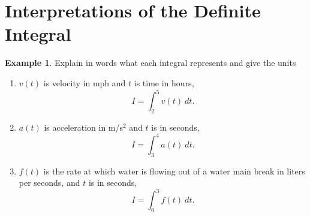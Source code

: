 \documentclass[oneside]{book}
\theoremstyle{definition}
\newtheorem{example}{Example}
\newcommand{\handoutpagebreak}{}
\theoremstyle{solution}
\newtheorem*{solution}{Solution}
\newcommand{\handoutpagebreak}{\newpage}
\newenvironment{solution}{\vspace{2in}\comment}{\endcomment}
\begin{document}
%
%
%
%

\handoutpagebreak
\section{Interpretations of the Definite Integral}
\begin{example}
  Explain in words what each integral represents and give the units
\begin{enumerate}
\item $v(t)$ is velocity in mph and $t$ is time in hours, 
  $$ 
  I = \int_2^5 v(t)\ dt.
  $$

\item $a(t)$ is acceleration in m/s$^2$ and $t$ is in seconds,
  $$
  I = \int_3^4 a(t)\ dt.
  $$

\item $f(t)$ is the rate at which water is flowing out of a water main
  break in liters per seconds, and $t$ is in seconds,
  $$ 
  I = \int_0^3 f(t)\ dt.
  $$
\end{enumerate}
\end{example}
\end{document}
